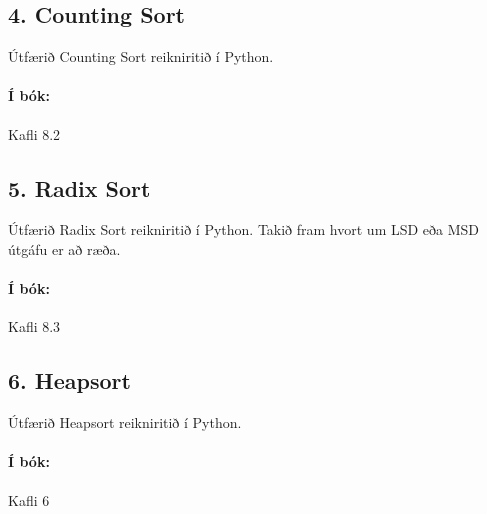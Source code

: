 \documentclass{article}
\begin{document}
\newpage
\subsection{4. Counting Sort}
Útfærið Counting Sort reikniritið í Python.

\paragraph{Í bók:} Kafli 8.2
\subsection{5. Radix Sort}
Útfærið Radix Sort reikniritið í Python. Takið fram hvort um LSD eða MSD útgáfu er að ræða.

\paragraph{Í bók:} Kafli 8.3

\subsection{6. Heapsort}
Útfærið Heapsort reikniritið í Python.

\paragraph{Í bók:} Kafli 6
\end{document}
